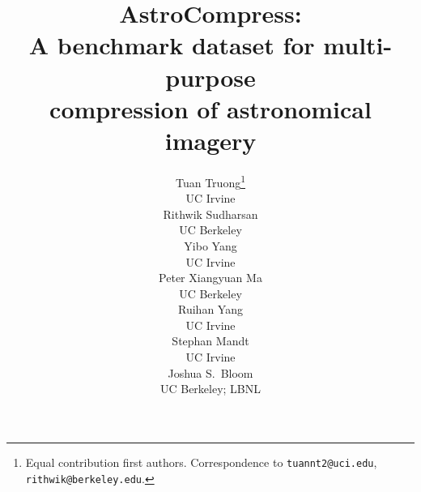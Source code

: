 

\usepackage{hyperref}
\usepackage{url}


\title{AstroCompress: \\A benchmark dataset for multi-purpose \\compression of astronomical imagery}


\author{%
  Tuan Truong\thanks{Equal contribution first authors. Correspondence to \texttt{tuannt2@uci.edu}, \texttt{rithwik@berkeley.edu}.} \\
  UC Irvine\\
  \And
  Rithwik Sudharsan\footnotemark[1] \\
  UC Berkeley\\
  \And
  Yibo Yang\\
  UC Irvine\\
  \And
  Peter Xiangyuan Ma\\
  UC Berkeley\\
  \And
  Ruihan Yang\\
  UC Irvine\\
  \And
  Stephan Mandt\\
  UC Irvine\\
  \And
  Joshua S.\ Bloom\\
  UC Berkeley; LBNL\\
}

%

